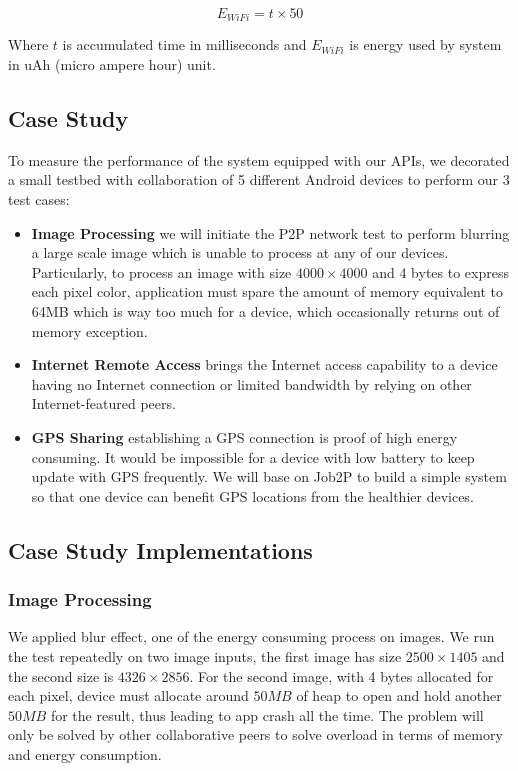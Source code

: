 \documentclass[conference]{IEEEtran}
\begin{document}
\begin{equation}
\label{eq:wifi_overload}
E_{WiFi} = t \times 50
\end{equation}

Where $t$ is accumulated time in milliseconds and $E_{WiFi}$ is energy used by system in uAh (micro ampere hour) unit.

\subsection{Case Study}
To measure the performance of the system equipped with our APIs, we decorated a small testbed with collaboration of 5 different Android devices to perform our 3 test cases:
\begin{itemize}
	\item \textbf{Image Processing} we will initiate the P2P network test to perform blurring a large scale image which is unable to process at any of our devices. Particularly, to process an image with size $4000 \times 4000$ and 4 bytes to express each pixel color, application must spare the amount of memory equivalent to 64MB which is way too much for a device, which occasionally returns out of memory exception.
	\item \textbf{Internet Remote Access} brings the Internet access capability to a device having no Internet connection or limited bandwidth by relying on other Internet-featured peers.
	\item \textbf{GPS Sharing} establishing a GPS connection is proof of high energy consuming. It would be impossible for a device with low battery to keep update with GPS frequently. We will base on Job2P to build a simple system so that one device can benefit GPS locations from the healthier devices.
\end{itemize}

\subsection{Case Study Implementations}

\subsubsection{Image Processing}
We applied blur effect, one of the energy consuming process on images. We run the test repeatedly on two image inputs, the first image has size $2500 \times 1405$ and the second size is $4326 \times 2856$. For the second image, with 4 bytes allocated for each pixel, device must allocate around $50MB$ of heap to open and hold another $50MB$ for the result, thus leading to app crash all the time. The problem will only be solved by other collaborative peers to solve overload in terms of memory and energy consumption.
\end{document}
